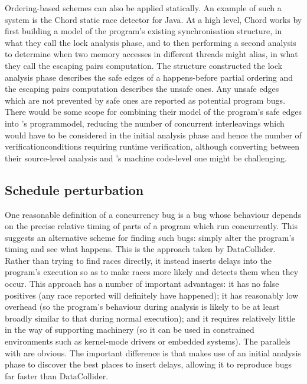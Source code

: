 Ordering-based schemes can also be applied statically.  An example of
such a system is the Chord static race detector for
Java\cite{Naik2006}.  At a high level, Chord works by first building a
model of the program's existing synchronisation structure, in what
they call the lock analysis phase, and to then performing a second
analysis to determine when two memory accesses in different threads
might alias, in what they call the escaping pairs computation.  The
structure constructed the lock analysis phase describes the safe edges
of a happens-before partial ordering and the escaping pairs
computation describes the unsafe ones.  Any unsafe edges which are not
prevented by safe ones are reported as potential program bugs.  There
would be some scope for combining their model of the program's safe
edges into {\technique}'s \gls{programmodel}, reducing the number of
concurrent interleavings which would have to be considered in the
initial analysis phase and hence the number of
\glspl{verificationcondition} requiring runtime verification, although
converting between their source-level analysis and {\technique}'s
machine code-level one might be challenging.

\subsection{Schedule perturbation}

One reasonable definition of a concurrency bug is a bug whose
behaviour depends on the precise relative timing of parts of a program
which run concurrently.  This suggests an alternative scheme for
finding such bugs: simply alter the program's timing and see what
happens.  This is the approach taken by
DataCollider\cite{Erickson2010}.  Rather than trying to find races
directly, it instead inserts delays into the program's execution so as
to make races more likely and detects them when they occur.  This
approach has a number of important advantages: it has no false
positives (any race reported will definitely have happened); it has
reasonably low overhead (so the program's behaviour during analysis is
likely to be at least broadly similar to that during normal
execution); and it requires relatively little in the way of supporting
machinery (so it can be used in constrained environments such as
kernel-mode drivers or embedded systems).  The parallels with
{\technique} are obvious.  The important difference is that
{\technique} makes use of an initial analysis phase to discover the
best places to insert delays, allowing it to reproduce bugs far faster
than DataCollider.

